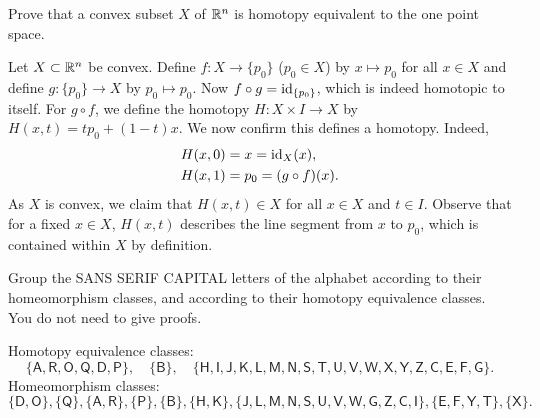 \begin{questions}
  \question Prove that a convex subset $X$ of $\mathbb{R}^n$ is homotopy equivalent to the one point space.
  \begin{solution}
    Let $X \subset \mathbb{R}^n$ be convex. Define $f: X \to \{p_0\}$ ($p_0 \in X$) by $x \mapsto p_0$ for all $x \in X$ and define $g: \{p_0\} \to X$ by $p_0 \mapsto p_0$. Now $f \circ g = \operatorname*{id}_{\{p_0\}}$, which is indeed homotopic to itself. For $g \circ f$, we define the homotopy $H: X \times I \to X$ by $H(x, t) = tp_0 + (1-t)x$. We now confirm this defines a homotopy. Indeed,
    \begin{align*}
      H(x, 0) & = x = {\operatorname*{id}}_{X}(x),     \\
      H(x, 1) & = p_0 = (g \circ f)(x).
    \end{align*}
    As $X$ is convex, we claim that $H(x, t) \in X$ for all $x \in X$ and $t \in I$. Observe that for a fixed $x \in X$, $H(x, t)$ describes the line segment from $x$ to $p_0$, which is contained within $X$ by definition.
  \end{solution}

  \question Group the \textsf{SANS SERIF CAPITAL} letters of the alphabet according to their homeomorphism classes, and according to their homotopy equivalence classes. You do not need to give proofs.
  \begin{solution}
    Homotopy equivalence classes:
    \[
      \mathsf{
        \{A, R, O, Q, D, P\}, \quad
        \{B\}, \quad
        \{H,I,J,K,L,M,N,S,T,U,V,W,X,Y,Z,C,E,F,G\}.
      }
    \]
    Homeomorphism classes:
    \[
      \mathsf{
        \{D,O\},
        \{Q\},
        \{A,R\},
        \{P\},
        \{B\},
        \{H,K\},
        \{J,L,M,N,S,U,V,W,G,Z,C,I\},
        \{E,F,Y,T\},
        \{X\}.
      }
    \]
  \end{solution}
\end{questions}

